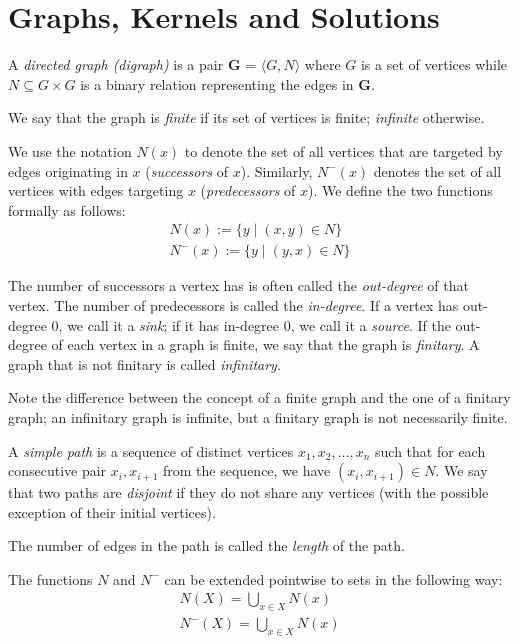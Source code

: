 \section{Graphs, Kernels and Solutions}
\label{sec:Graphs, Kernels and Solutions}
\begin{definition}
  A \textit{directed graph (digraph)} is a pair \textbf{G} = $\langle G,N \rangle$ where $G$ is a set of vertices while $N \subseteq G \times G$ is a binary relation representing the edges in \textbf{G}.
\end{definition}
We say that the graph is \textit{finite} if its set of vertices is finite; \textit{infinite} otherwise.

We use the notation $N(x)$ to denote the set of all vertices that are targeted by edges originating in $x$ (\textit{successors} of $x$).
Similarly, $N^-(x)$ denotes the set of all vertices with edges targeting $x$ (\textit{predecessors} of $x$).
We define the two functions formally as follows:
\begin{align}
  N(x) := \{y \;|\; (x,y) \in N\}\\
  N^-(x) := \{ y \;|\; (y,x) \in N \}
\end{align}
\begin{definition}
  The number of successors a vertex has is often called the \textit{out-degree} of that vertex.
  The number of predecessors is called the \textit{in-degree}.
  If a vertex has out-degree 0, we call it a \textit{sink}; if it has in-degree 0, we call it a \textit{source}.
  If the out-degree of each vertex in a graph is finite, we say that the graph is \textit{finitary}.
  A graph that is not finitary is called \textit{infinitary}.
\end{definition}
Note the difference between the concept of a finite graph and the one of a finitary graph;
an infinitary graph is infinite, but a finitary graph is not necessarily finite.
\begin{definition}
  A \textit{simple path} is a sequence of distinct vertices $x_1,x_2,\dots,x_n$ such that for each consecutive pair $x_i,x_{i+1}$ from the sequence, we have $(x_i, x_{i+1}) \in N$.
  We say that two paths are \textit{disjoint} if they do not share any vertices (with the possible exception of their initial vertices).
\end{definition}
The number of edges in the path is called the \textit{length} of the path.

The functions $N$ and $N^-$ can be extended pointwise to sets in the following way:
\begin{align}
  N(X) = \bigcup_{x \in X} N(x)\\
  N^-(X) = \bigcup_{x \in X} N(x)
\end{align}

